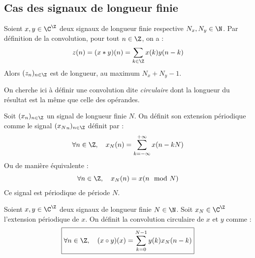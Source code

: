 \subsection{Cas des signaux de longueur finie}

\begin{remark}
    Soient $x, y \in \C^\Z$ deux signaux de longueur finie respective $N_x, N_y \in \N$. 
    Par définition de la convolution, pour tout $n \in \Z$, on a : 
        $$ z(n) = (x * y)(n) = \sum_{k \in \Z} x(k) y(n - k) $$
    Alors $(z_n)_{n \in \Z}$ est de longueur, au maximum $N_x + N_y - 1$.
\end{remark}

On cherche ici à définir une convolution dite \emph{circulaire} dont la longueur du résultat 
est la même que celle des opérandes. 

\begin{definition}
    Soit $(x_n)_{n \in \Z}$ un signal de longueur finie $N$. On définit son extension 
    périodique comme le signal $({x_N}_n)_{n \in \Z}$ définit par : 
        \begin{equation} 
            \forall n \in \Z, \quad {x}_N(n) = \sum_{k=-\infty}^{+\infty} x(n - kN) 
        \end{equation}
    Ou de manière équivalente : 
        \begin{equation} 
            \forall n \in \Z, \quad {x}_N(n) = x(n \mod N) 
        \end{equation}
    Ce signal est périodique de période $N$. 
\end{definition}

\begin{definition}
    Soient $x, y \in \C^\Z$ deux signaux de longueur finie $N \in \N$. Soit $x_N \in \C^\Z$ 
    l'extension périodique de $x$. On définit la convolution circulaire de $x$ et $y$ comme : 
        \begin{equation}
            \boxed{\forall n \in \Z, \quad (x \circ y)(x) = \sum_{k=0}^{N-1} y(k) x_N(n - k)}
        \end{equation}
\end{definition}


